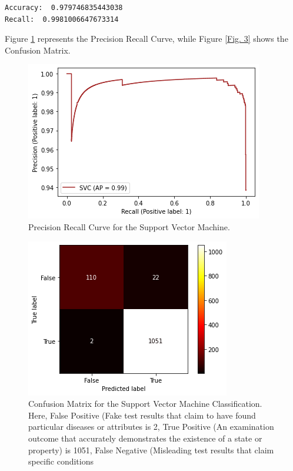 \documentclass[sn-basic]{sn-jnl}%
\theoremstyle{thmstyleone}%
\theoremstyle{thmstyletwo}%
\theoremstyle{thmstylethree}%
\begin{document}
\begin{enumerate}
\begin{verbatim}
Accuracy:  0.979746835443038
Recall:  0.9981006647673314
\end{verbatim}
Figure \ref{Fig. 2} represents the Precision Recall Curve, while Figure \ref{Fig. 3} shows the Confusion Matrix. 
\begin{figure}[!h]
\centering
\includegraphics[width=\textwidth]{PRC_SVM}
\caption{Precision Recall Curve for the Support Vector Machine. }
\label{Fig. 2}
\end{figure}
\begin{figure}[!h]
\centering
\includegraphics[width=\textwidth]{CM_SVM}
\caption{Confusion Matrix for the Support Vector Machine Classification. Here, False Positive (Fake test results that claim to have found particular diseases or attributes is 2, True Positive (An examination outcome that accurately demonstrates the existence of a state or property) is 1051, False Negative (Misleading test results that claim specific conditions
}
\end{figure}
\end{enumerate}
\end{document}
